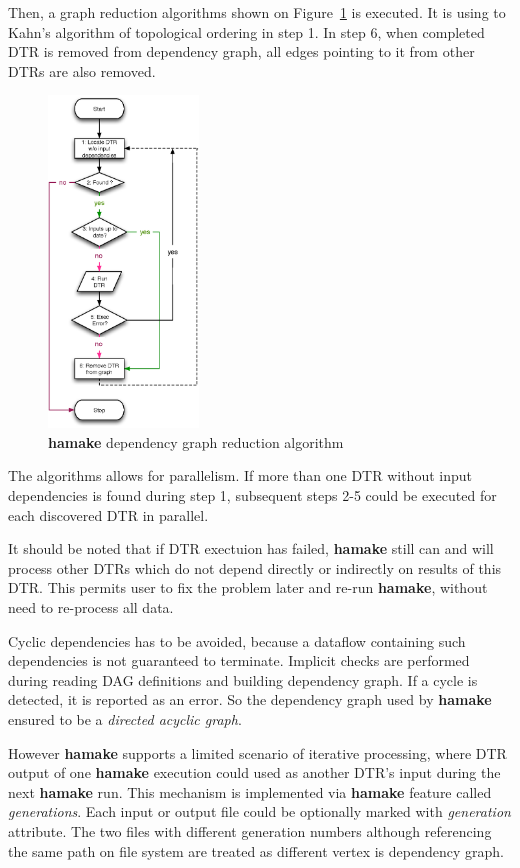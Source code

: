 \documentclass[10pt,conference,letterpaper]{IEEEtran}
\begin{document}
Then, a graph reduction algorithms shown on Figure~\ref{fig:grred} is
executed. It is using to Kahn's algorithm\cite{kahn1962topological} of
topological ordering in step 1. In step 6, when completed DTR is
removed from dependency graph, all edges pointing to it from other
DTRs are also removed.

\begin{figure}[htp]
\centering
\includegraphics[width=4cm]{GraphReduction.eps}
\caption{\textbf{hamake} dependency graph reduction algorithm}
\label{fig:grred}
\end{figure}

The algorithms allows for parallelism. If more than one DTR without
input dependencies is found during step 1, subsequent steps 2-5 could
be executed for each discovered DTR in parallel.

It should be noted that if DTR exectuion has failed, \textbf{hamake} still can
and will process other DTRs which do not depend directly or indirectly
on results of this DTR. This permits user to fix the problem later and
re-run \textbf{hamake}, without need to re-process all data.

Cyclic dependencies has to be avoided, because a dataflow containing
such dependencies is not guaranteed to terminate. Implicit checks are
performed during reading DAG definitions and building dependency
graph. If a cycle is detected, it is reported as an error. So the
dependency graph used by \textbf{hamake} ensured to be a
\textit{directed acyclic graph}.

However \textbf{hamake} supports a limited scenario of iterative
processing, where DTR output of one \textbf{hamake} execution could used as
another DTR's input during the next \textbf{hamake} run. This mechanism is
implemented via \textbf{hamake} feature called
\textit{generations}. Each input or output file could be optionally
marked with \emph{generation} attribute. The two files with different
generation numbers although referencing the same path on file system
are treated as different vertex is dependency graph.
\end{document}
